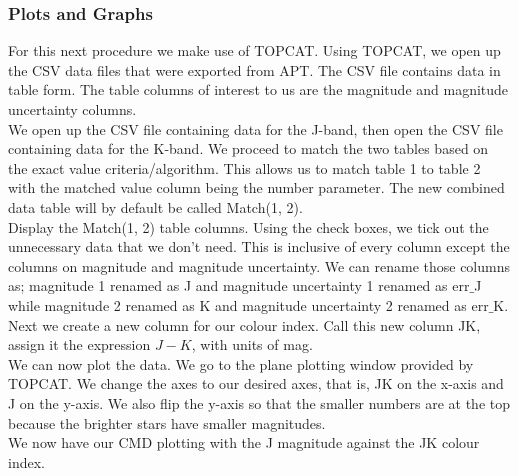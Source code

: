 \documentclass[12pt]{article}
\begin{document}
		\subsubsection{Plots and Graphs}
		For this next procedure we make use of TOPCAT. Using TOPCAT, we open up the CSV data files that were exported from APT. The CSV file contains data in table form. The table columns of interest to us are the magnitude and magnitude uncertainty columns.\\
		We open up the CSV file containing data for the J-band, then open the CSV file containing data for the K-band. We proceed to match the two tables based on the exact value criteria/algorithm. This allows us to match table 1 to table 2 with the matched value column being the number parameter. The new combined data table will by default be called Match(1, 2).\\
		Display the Match(1, 2) table columns. Using the check boxes, we tick out the unnecessary data that we don't need. This is inclusive of every column except the columns on magnitude and magnitude uncertainty. We can rename those columns as; magnitude 1 renamed as J and magnitude uncertainty 1 renamed as err$\_$J while magnitude 2 renamed as K and magnitude uncertainty 2 renamed as err$\_$K.\\
		Next we create a new column for our colour index. Call this new column JK, assign it the expression $J - K$, with units of mag.\\
		We can now plot the data. We go to the plane plotting window provided by TOPCAT. We change the axes to our desired axes, that is, JK on the x-axis and J on the y-axis. We also flip the y-axis so that the smaller numbers are at the top because the brighter stars have smaller magnitudes.\\
		We now have our CMD plotting with the J magnitude against the JK colour index.
		
	\pagebreak
\end{document}
